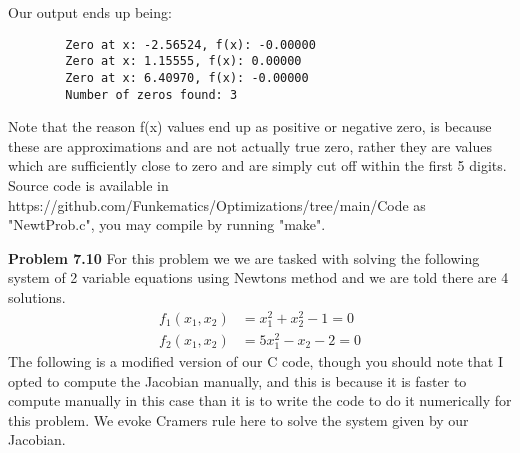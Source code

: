 \documentclass{article}
\begin{document}
Our output ends up being:
\begin{lstlisting}
        Zero at x: -2.56524, f(x): -0.00000
        Zero at x: 1.15555, f(x): 0.00000
        Zero at x: 6.40970, f(x): -0.00000
        Number of zeros found: 3
\end{lstlisting}
Note that the reason f(x) values end up as positive or negative zero, is because these are approximations and are not actually true zero, rather they are values which are sufficiently close to zero and are simply cut off within the first 5 digits. Source code is available in https://github.com/Funkematics/Optimizations/tree/main/Code as "NewtProb.c", you may compile by running "make".

\textbf{Problem 7.10} For this problem we we are tasked with solving the following system of 2 variable equations using Newtons method and we are told there are 4 solutions. 
\begin{align*}
    f_1(x_1,x_2) & = x_1^2 + x_2^2 - 1 = 0 \\
    f_2(x_1,x_2) & = 5x_1^2 - x_2 - 2 = 0
\end{align*}
The following is a modified version of our C code, though you should note that I opted to compute the Jacobian manually, and this is because it is faster to compute manually in this case than it is to write the code to do it numerically for this problem. We evoke Cramers rule here to solve the system given by our Jacobian.
\end{document}
